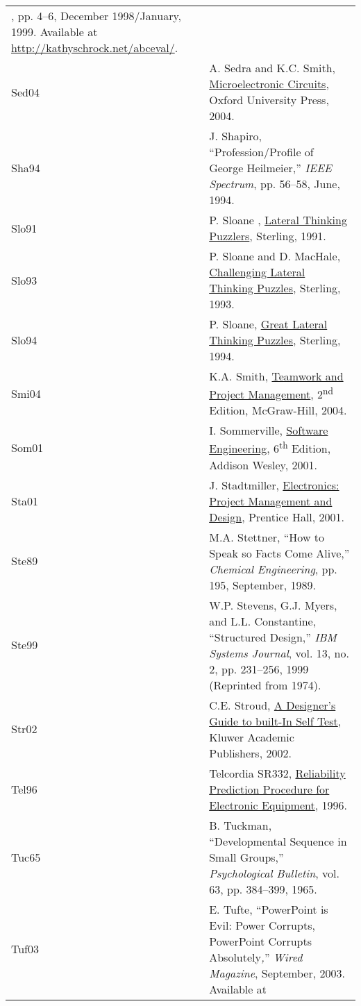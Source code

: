 \begin{longtable}[]{@{}
  >{\raggedright\arraybackslash}p{}
  >{\raggedright\arraybackslash}p{}@{}}
{Connect}, pp. 4--6, December 1998/January, 1999. Available at
\url{http://kathyschrock.net/abceval/}. \\
Sed04 & A. Sedra and K.C. Smith, \ul{Microelectronic Circuits}, Oxford
University Press, 2004. \\
Sha94 & J. Shapiro, ``Profession/Profile of George Heilmeier,''
\emph{IEEE Spectrum}, pp. 56--58, June, 1994. \\
Slo91 & P. Sloane , \ul{Lateral Thinking Puzzlers}, Sterling, 1991. \\
Slo93 & P. Sloane and D. MacHale, \ul{Challenging Lateral Thinking
Puzzles}, Sterling, 1993. \\
Slo94 & P. Sloane, \ul{Great Lateral Thinking Puzzles}, Sterling,
1994. \\
Smi04 & K.A. Smith, \ul{Teamwork and Project Management},
2\textsuperscript{nd} Edition, McGraw-Hill, 2004. \\
Som01 & I. Sommerville, \ul{Software Engineering}, 6\textsuperscript{th}
Edition, Addison Wesley, 2001. \\
Sta01 & J. Stadtmiller, \ul{Electronics: Project Management and Design},
Prentice Hall, 2001. \\
Ste89 & M.A. Stettner, ``How to Speak so Facts Come Alive,''
\emph{Chemical Engineering}, pp. 195, September, 1989. \\
Ste99 & W.P. Stevens, G.J. Myers, and L.L. Constantine, ``Structured
Design,'' \emph{IBM Systems Journal}, vol. 13, no. 2, pp. 231--256, 1999
(Reprinted from 1974). \\
Str02 & C.E. Stroud, \ul{A Designer's Guide to built-In Self Test},
Kluwer Academic Publishers, 2002. \\
Tel96 & Telcordia SR332, \ul{Reliability Prediction Procedure for
Electronic Equipment}, 1996. \\
Tuc65 & B. Tuckman, ``Developmental Sequence in Small Groups,''
\emph{Psychological Bulletin}, vol. 63, pp. 384--399, 1965. \\
Tuf03 & E. Tufte, ``PowerPoint is Evil: Power Corrupts, PowerPoint
Corrupts Absolutely\emph{,}'' \emph{Wired Magazine}, September, 2003.
Available at


\end{longtable}
